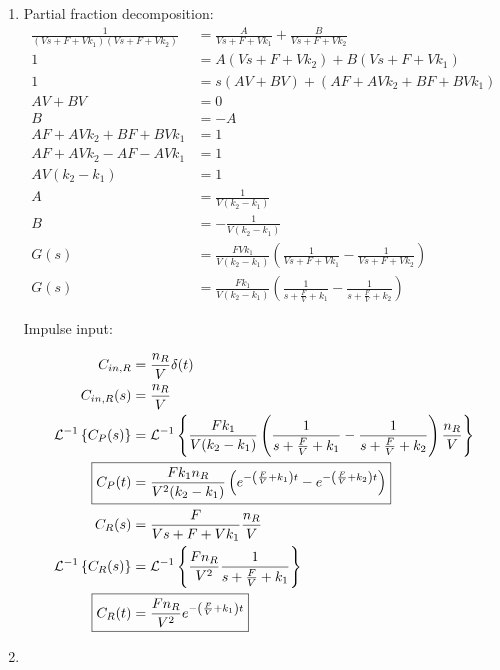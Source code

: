 \documentclass[12pt]{article}
\begin{document}
\begin{enumerate}
\begin{enumerate}
    \item Partial fraction decomposition:
    \begin{align*}
        \frac{1}{(Vs + F + Vk_1) (V s + F + V k_2)} &= \frac{A}{Vs + F + Vk_1} + \frac{B}{V s + F + V k_2} \\
        1 &= A (V s + F + V k_2) + B (Vs + F + Vk_1) \\
        1 &= s (A V + B V) + (A F + A V k_2 + B F + B V k_1) \\
        A V + B V &= 0 \\
        B &= -A \\
        A F + A V k_2 + B F + B V k_1 &= 1 \\
        A F + A V k_2 - A F - A V k_1 &= 1 \\
        A V (k_2 - k_1) &= 1 \\
        A &= \frac{1}{V (k_2 - k_1)} \\
        B &= -\frac{1}{V (k_2 - k_1)} \\
        G(s) &= \frac{F V k_1}{V (k_2 - k_1)} \left(\frac{1}{Vs + F + Vk_1} - \frac{1}{V s + F + V k_2}\right) \\
        G(s) &= \frac{F k_1}{V (k_2 - k_1)} \left(\frac{1}{s + \frac{F}{V} + k_1} - \frac{1}{s + \frac{F}{V} + k_2}\right)
    \end{align*}

    Impulse input:

    \begin{align*}
        C_{in, R} &= \frac{n_R}{V} \delta(t) \\
        C_{in, R}(s) &= \frac{n_R}{V} \\
        \mathcal{L}^{-1}\left\{C_P(s)\right\} &= \mathcal{L}^{-1}\left\{\frac{F k_1}{V (k_2 - k_1)} \left(\frac{1}{s + \frac{F}{V} + k_1} - \frac{1}{s + \frac{F}{V} + k_2}\right) \frac{n_R}{V}\right\} \\
        \Aboxed{C_P(t) &= \frac{F k_1 n_R}{V^2 (k_2 - k_1)} \left(e^{-\left(\frac{F}{V} + k_1\right) t } - e^{-\left(\frac{F}{V} + k_2\right) t }\right)} \\
        C_R(s) &= \frac{F}{Vs + F + Vk_1} \frac{n_R}{V} \\
        \mathcal{L}^{-1}\left\{C_R(s)\right\} &= \mathcal{L}^{-1}\left\{\frac{F n_R}{V^2} \frac{1}{s + \frac{F}{V} + k_1}\right\} \\
        \Aboxed{C_R(t) &= \frac{F n_R}{V^2} e^{-\left(\frac{F}{V} + k_1\right) t }}
    \end{align*}
    
    \item


\end{enumerate}
\end{enumerate}
\end{document}
